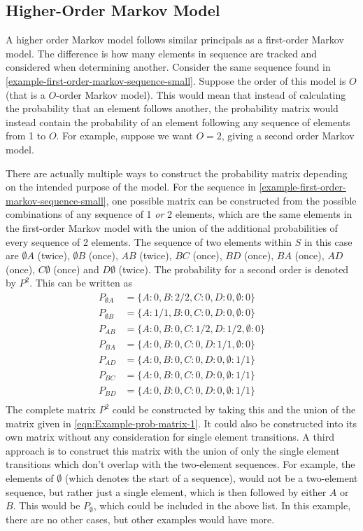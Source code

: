 \subsection{Higher-Order Markov Model}

A higher order Markov model follows similar principals as a first-order Markov model. The difference is how many elements in sequence are tracked and considered when determining another. Consider the same sequence found in \ref{example-first-order-markov-sequence-small}. Suppose the order of this model is $O$ (that is a $O$-order Markov model). This would mean that instead of calculating the probability that an element follows another, the probability matrix would instead contain the probability of an element following any sequence of elements from 1 to $O$. For example, suppose we want $O=2$, giving a second order Markov model. 

There are actually multiple ways to construct the probability matrix depending on the intended purpose of the model. For the sequence in \ref{example-first-order-markov-sequence-small}, one possible matrix can be constructed from the possible combinations of any sequence of 1 \textit{or} 2 elements, which are the same elements in the first-order Markov model with the union of the additional probabilities of every sequence of 2 elements. The sequence of two elements within $S$ in this case are $\emptyset A$ (twice), $\emptyset B$ (once), $AB$ (twice), $BC$ (once), $BD$ (once), $BA$ (once), $AD$ (once), $C\emptyset$ (once) and $D\emptyset$ (twice). The probability for a second order is denoted by $P^2$. This can be written as
\begin{align}
P_{\emptyset A} &= \{A:0, B:2/2, C:0, D:0, \emptyset:0 \} \\
P_{\emptyset B} &= \{A:1/1, B:0, C:0, D:0, \emptyset:0 \} \\
P_{AB} &= \{A:0, B:0, C:1/2, D:1/2, \emptyset:0 \} \\
P_{BA} &= \{A:0, B:0, C:0, D:1/1, \emptyset:0 \} \\
P_{AD} &= \{A:0, B:0, C:0, D:0, \emptyset:1/1 \} \\
P_{BC} &= \{A:0, B:0, C:0, D:0, \emptyset:1/1 \} \\
P_{BD} &= \{A:0, B:0, C:0, D:0, \emptyset:1/1 \} \\
\end{align}
The complete matrix $P^2$ could be constructed by taking this and the union of the matrix given in \ref{eqn:Example-prob-matrix-1}. It could also be constructed into its own matrix without any consideration for single element transitions. A third approach is to construct this matrix with the union of only the single element transitions which don't overlap with the two-element sequences. For example, the elements of $\emptyset$ (which denotes the start of a sequence), would not be a two-element sequence, but rather just a single element, which is then followed by either $A$ or $B$. This would be $P_\emptyset$, which could be included in the above list. In this example, there are no other cases, but other examples would have more. 

